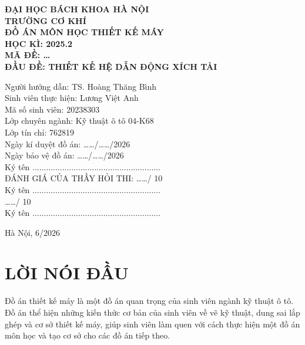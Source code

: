 \documentclass[12pt,a4paper]{report}
\begin{document}
\begin{titlepage}
\begin{center}
    \large \textbf{ĐẠI HỌC BÁCH KHOA HÀ NỘI}\\
    \large \textbf{TRƯỜNG CƠ KHÍ}\\[1.5cm]
    \Large \textbf{ĐỒ ÁN MÔN HỌC THIẾT KẾ MÁY}\\[0.5cm]
    \large \textbf{HỌC KÌ: 2025.2}\\
    \large \textbf{MÃ ĐỀ: \dots}\\[1cm]
    \Large \textbf{ĐẦU ĐỀ: THIẾT KẾ HỆ DẪN ĐỘNG XÍCH TẢI}\\[2cm]
\end{center}

\begin{flushleft}
    \large
    Người hướng dẫn: TS. Hoàng Thăng Bình\\
    Sinh viên thực hiện: Lương Việt Anh\\
    Mã số sinh viên: 20238303\\
    Lớp chuyên ngành: Kỹ thuật ô tô 04-K68\\
    Lớp tín chỉ: 762819\\[1cm]
    Ngày kí duyệt đồ án: \dots\dots/\dots\dots/2026\\
    Ngày bảo vệ đồ án: \dots\dots/\dots\dots/2026\\
    Ký tên ........................................................\\[1cm]
    ĐÁNH GIÁ CỦA THẦY HỎI THI: \dots\dots / 10\\
    Ký tên ........................................................\\[0.5cm]
    \dots\dots / 10\\
    Ký tên ........................................................
\end{flushleft}

\vfill
\begin{center}
    \large Hà Nội, 6/2026
\end{center}
\end{titlepage}

\tableofcontents
\listoftables
\listoffigures

\chapter*{LỜI NÓI ĐẦU}
Đồ án thiết kế máy là một đồ án quan trọng của sinh viên ngành kỹ thuật ô tô. Đồ án thể hiện những kiến thức cơ bản của sinh viên về vẽ kỹ thuật, dung sai lắp ghép và cơ sở thiết kế máy, giúp sinh viên làm quen với cách thực hiện một đồ án môn học và tạo cơ sở cho các đồ án tiếp theo.
\end{document}

